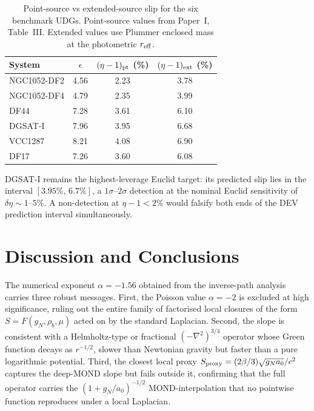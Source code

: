 \documentclass[aps,prd,twocolumn,superscriptaddress,nofootinbib]{revtex4-2}
\newcommand{\aO}{a_0}
\begin{document}
\begin{table}[h]
\caption{Point-source vs extended-source slip for the six
benchmark UDGs. Point-source values from Paper~I,
Table~III. Extended values use Plummer enclosed mass at
the photometric $r_{\rm eff}$.}
\label{tab:udg_ext}
\begin{ruledtabular}
\begin{tabular}{lccc}
System & $\epsilon$ & $(\eta-1)_{\rm pt}$ (\%)
                    & $(\eta-1)_{\rm ext}$ (\%) \\
\hline
NGC1052-DF2 & 4.56 & 2.23 & 3.78 \\
NGC1052-DF4 & 4.79 & 2.35 & 3.99 \\
DF44        & 7.28 & 3.61 & 6.10 \\
DGSAT-I     & 7.96 & 3.95 & 6.68 \\
VCC1287     & 8.21 & 4.08 & 6.90 \\
DF17        & 7.26 & 3.60 & 6.08 \\
\end{tabular}
\end{ruledtabular}
\end{table}

DGSAT-I remains the highest-leverage Euclid target: its
predicted slip lies in the interval $[3.95\%,\,6.7\%]$,
a $1\sigma$--$2\sigma$ detection at the nominal Euclid
sensitivity of $\delta\eta\sim 1$--$5\%$. A non-detection
at $\eta-1 < 2\%$ would falsify both ends of the DEV
prediction interval simultaneously.

\section{Discussion and Conclusions}
\label{sec:discuss}

The numerical exponent $\alpha = -1.56$ obtained from the
inverse-path analysis carries three robust messages.
First, the Poisson value $\alpha = -2$ is excluded at high
significance, ruling out the entire family of factorised
local closures of the form $S = F(g_N,\rho_b,\mu)$ acted
on by the standard Laplacian. Second, the slope is
consistent with a Helmholtz-type or fractional
$(-\nabla^2)^{3/4}$ operator whose Green function decays
as $r^{-1/2}$, slower than Newtonian gravity but faster
than a pure logarithmic potential. Third, the closest
local proxy $S_{\rm proxy}=(2\beta/3)\sqrt{g_N\aO}/c^2$
captures the deep-MOND slope but fails outside it,
confirming that the full operator carries the
$(1+g_N/\aO)^{-1/2}$ MOND-interpolation that no pointwise
function reproduces under a local Laplacian.
\end{document}
